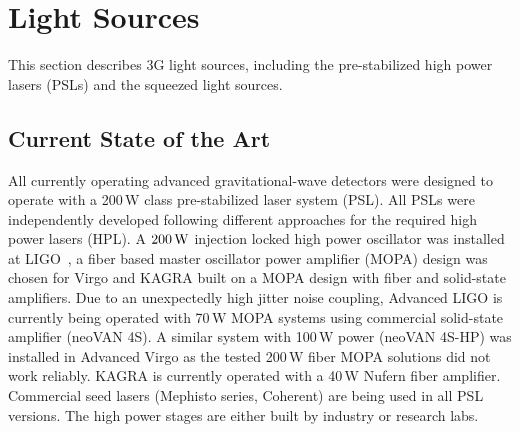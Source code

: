 
\chapter{Light Sources}
\label{sec:Light_sources}

This section describes 3G light sources, including the pre-stabilized high power lasers (PSLs) and the squeezed light sources. 

\section{Current State of the Art}
All currently operating advanced gravitational-wave detectors were designed to operate with a 200\,W class pre-stabilized laser system (PSL). All PSLs were independently developed following different approaches for the required high power lasers (HPL). A $ 200\,{\rm W} $ injection locked high power oscillator was installed at LIGO~\cite{Kwee:12}, a fiber based master oscillator power amplifier (MOPA) design was chosen for Virgo and KAGRA built on a MOPA design with fiber and solid-state amplifiers. Due to an unexpectedly high jitter noise coupling, Advanced LIGO is currently being operated with 70\,W MOPA systems using commercial solid-state amplifier (neoVAN 4S). A similar system with 100\,W power (neoVAN 4S-HP) was installed in Advanced Virgo as the tested 200\,W fiber MOPA solutions did not work reliably. KAGRA is currently operated with a 40\,W Nufern fiber amplifier. Commercial seed lasers (Mephisto series, Coherent) are being used in all PSL versions. The high power stages are either built by industry or research labs. 

